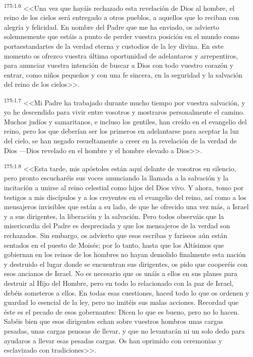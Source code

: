\par 
\textsuperscript{175:1.6} <<Una vez que hayáis rechazado esta revelación de Dios al hombre, el reino de los cielos será entregado a otros pueblos, a aquellos que lo reciban con alegría y felicidad. En nombre del Padre que me ha enviado, os advierto solemnemente que estáis a punto de perder vuestra posición en el mundo como portaestandartes de la verdad eterna y custodios de la ley divina. En este momento os ofrezco vuestra última oportunidad de adelantaros y arrepentiros, para anunciar vuestra intención de buscar a Dios con todo vuestro corazón y entrar, como niños pequeños y con una fe sincera, en la seguridad y la salvación del reino de los cielos>>.

\par 
\textsuperscript{175:1.7} <<Mi Padre ha trabajado durante mucho tiempo por vuestra salvación, y yo he descendido para vivir entre vosotros y mostraros personalmente el camino. Muchos judíos y samaritanos, e incluso los gentiles, han creído en el evangelio del reino, pero los que deberían ser los primeros en adelantarse para aceptar la luz del cielo, se han negado resueltamente a creer en la revelación de la verdad de Dios ---Dios revelado en el hombre y el hombre elevado a Dios>>.

\par 
\textsuperscript{175:1.8} <<Esta tarde, mis apóstoles están aquí delante de vosotros en silencio, pero pronto escucharéis sus voces anunciando la llamada a la salvación y la incitación a unirse al reino celestial como hijos del Dios vivo. Y ahora, tomo por testigos a mis discípulos y a los creyentes en el evangelio del reino, así como a los mensajeros invisibles que están a su lado, de que he ofrecido una vez más, a Israel y a sus dirigentes, la liberación y la salvación. Pero todos observáis que la misericordia del Padre es despreciada y que los mensajeros de la verdad son rechazados. Sin embargo, os advierto que esos escribas y fariseos aún están sentados en el puesto de Moisés; por lo tanto, hasta que los Altísimos que gobiernan en los reinos de los hombres no hayan demolido finalmente esta nación y destruido el lugar donde se encuentran sus dirigentes, os pido que cooperéis con esos ancianos de Israel. No es necesario que os unáis a ellos en sus planes para destruir al Hijo del Hombre, pero en todo lo relacionado con la paz de Israel, debéis someteros a ellos. En todas esas cuestiones, haced todo lo que os ordenen y guardad lo esencial de la ley, pero no imitéis sus malas acciones. Recordad que éste es el pecado de esos gobernantes: Dicen lo que es bueno, pero no lo hacen. Sabéis bien que esos dirigentes echan sobre vuestros hombros unas cargas pesadas, unas cargas penosas de llevar, y que no levantarán ni un solo dedo para ayudaros a llevar esas pesadas cargas. Os han oprimido con ceremonias y esclavizado con tradiciones>>.

